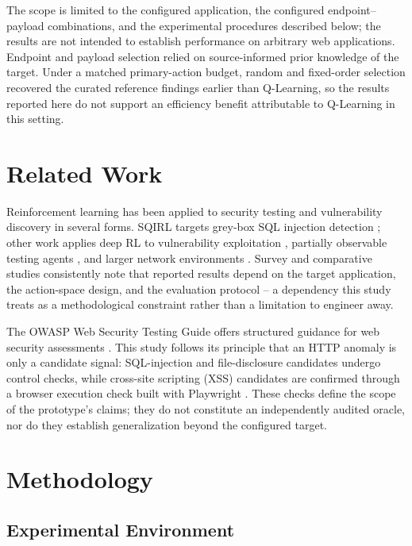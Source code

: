\documentclass[conference, a4paper]{IEEEtran}
\begin{document}
The scope is limited to the configured application, the
configured endpoint--payload combinations, and the experimental
procedures described below; the results are not intended to
establish performance on arbitrary web applications. Endpoint and
payload selection relied on source-informed prior knowledge of the
target. Under a matched primary-action budget, random and
fixed-order selection recovered the curated reference findings
earlier than Q-Learning, so the results reported here do not
support an efficiency benefit attributable to Q-Learning in this
setting.

\section{Related Work}

Reinforcement learning has been applied to security testing and
vulnerability discovery in several forms. SQIRL targets grey-box
SQL injection detection \cite{sqirl2023}; other work applies deep
RL to vulnerability exploitation \cite{almajali2024}, partially
observable testing agents \cite{li2025}, and larger network
environments \cite{ghanem2023}. Survey and comparative studies
consistently note that reported results depend on the target
application, the action-space design, and the evaluation protocol
\cite{rlreview2026,sok2024} -- a dependency this study treats as a
methodological constraint rather than a limitation to engineer away.

The OWASP Web Security Testing Guide offers structured guidance for
web security assessments \cite{owaspwstg}. This study follows its
principle that an HTTP anomaly is only a candidate signal:
SQL-injection and file-disclosure candidates undergo control checks,
while cross-site scripting (XSS) candidates are confirmed through a
browser execution check built with Playwright \cite{playwright}.
These checks define the scope of the prototype's claims; they do
not constitute an independently audited oracle, nor do they
establish generalization beyond the configured target.

\section{Methodology}

\subsection{Experimental Environment}
\end{document}
